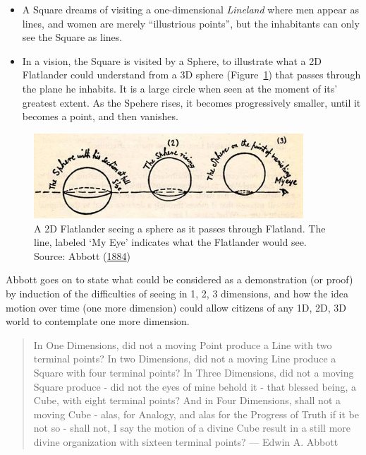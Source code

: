 \documentclass[
  letterpaper,
  10pt,
  krantz2]{krantz}
\begin{document}
\begin{itemize}
\item
  A Square dreams of visiting a one-dimensional \emph{Lineland} where
  men appear as lines, and women are merely ``illustrious points'', but
  the inhabitants can only see the Square as lines.
\item
  In a vision, the Square is visited by a Sphere, to illustrate what a
  2D Flatlander could understand from a 3D sphere
  (Figure~\ref{fig-flatland-spheres}) that passes through the plane he
  inhabits. It is a large circle when seen at the moment of its'
  greatest extent. As the Spehere rises, it becomes progressively
  smaller, until it becomes a point, and then vanishes.
\end{itemize}

\begin{figure}

{\centering \includegraphics[width=0.9\textwidth,height=\textheight]{images/flatland-spheres.jpg}

}

\caption{\label{fig-flatland-spheres}A 2D Flatlander seeing a sphere as
it passes through Flatland. The line, labeled `My Eye' indicates what
the Flatlander would see. Source: Abbott
(\protect\hyperlink{ref-Abbott:1884}{1884})}

\end{figure}

Abbott goes on to state what could be considered as a demonstration (or
proof) by induction of the difficulties of seeing in 1, 2, 3 dimensions,
and how the idea motion over time (one more dimension) could allow
citizens of any 1D, 2D, 3D world to contemplate one more dimension.

\begin{quote}
In One Dimensions, did not a moving Point produce a Line with two
terminal points? In two Dimensions, did not a moving Line produce a
Square with four terminal points? In Three Dimensions, did not a moving
Square produce - did not the eyes of mine behold it - that blessed
being, a Cube, with eight terminal points? And in Four Dimensions, shall
not a moving Cube - alas, for Analogy, and alas for the Progress of
Truth if it be not so - shall not, I say the motion of a divine Cube
result in a still more divine organization with sixteen terminal points?
--- Edwin A. Abbott
\end{quote}
\end{document}
